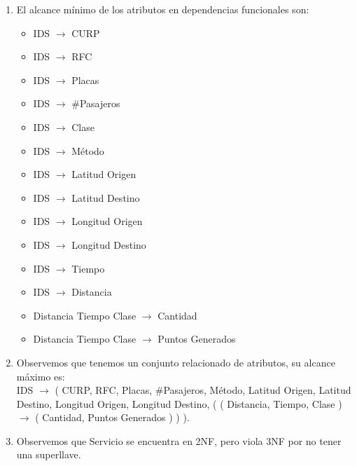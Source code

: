 \documentclass{article}
\begin{document}
       \begin{enumerate}
       \item El alcance mínimo de los atributos en dependencias funcionales son:
         \begin{multicols}{2}
           \begin{itemize}
           \item IDS $\rightarrow$ CURP
           \item IDS $\rightarrow$ RFC
           \item IDS $\rightarrow$ Placas
           \item IDS $\rightarrow$ $\#$Pasajeros
           \item IDS $\rightarrow$ Clase
           \item IDS $\rightarrow$ Método
           \item IDS $\rightarrow$ Latitud Origen
           \item IDS $\rightarrow$ Latitud Destino
           \item IDS $\rightarrow$ Longitud Origen
           \item IDS $\rightarrow$ Longitud Destino
           \item IDS $\rightarrow$ Tiempo
           \item IDS $\rightarrow$ Distancia
           \item Distancia Tiempo Clase $\rightarrow$ Cantidad
           \item Distancia Tiempo Clase $\rightarrow$ Puntos Generados
           \end{itemize}
         \end{multicols}
       \item Observemos que tenemos un conjunto relacionado de atributos,
         su alcance máximo es:\\

         IDS $\rightarrow$ ( CURP, RFC, Placas, $\#$Pasajeros, Método, Latitud Origen,
           Latitud Destino, Longitud Origen, Longitud Destino, ( ( Distancia, Tiempo,
           Clase ) $\rightarrow$ ( Cantidad, Puntos Generados ) ) ).
           
         \item Observemos que Servicio se encuentra en 2NF, pero viola 3NF por no tener una superllave.


\end{enumerate}
\end{document}
